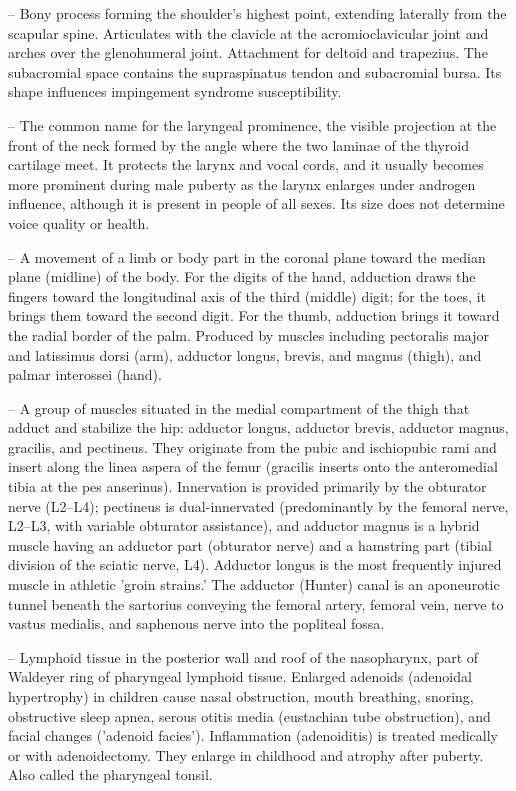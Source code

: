 -- Bony process forming the shoulder's highest point, extending laterally from the scapular spine. Articulates with the clavicle at the acromioclavicular joint and arches over the glenohumeral joint. Attachment for deltoid and trapezius. The subacromial space contains the supraspinatus tendon and subacromial bursa. Its shape influences impingement syndrome susceptibility.

-- The common name for the laryngeal prominence, the visible projection at the front of the neck formed by the angle where the two laminae of the thyroid cartilage meet. It protects the larynx and vocal cords, and it usually becomes more prominent during male puberty as the larynx enlarges under androgen influence, although it is present in people of all sexes. Its size does not determine voice quality or health.

-- A movement of a limb or body part in the coronal plane toward the median plane (midline) of the body. For the digits of the hand, adduction draws the fingers toward the longitudinal axis of the third (middle) digit; for the toes, it brings them toward the second digit. For the thumb, adduction brings it toward the radial border of the palm. Produced by muscles including pectoralis major and latissimus dorsi (arm), adductor longus, brevis, and magnus (thigh), and palmar interossei (hand).

-- A group of muscles situated in the medial compartment of the thigh that adduct and stabilize the hip: adductor longus, adductor brevis, adductor magnus, gracilis, and pectineus. They originate from the pubic and ischiopubic rami and insert along the linea aspera of the femur (gracilis inserts onto the anteromedial tibia at the pes anserinus). Innervation is provided primarily by the obturator nerve (L2--L4); pectineus is dual-innervated (predominantly by the femoral nerve, L2--L3, with variable obturator assistance), and adductor magnus is a hybrid muscle having an adductor part (obturator nerve) and a hamstring part (tibial division of the sciatic nerve, L4). Adductor longus is the most frequently injured muscle in athletic 'groin strains.' The adductor (Hunter) canal is an aponeurotic tunnel beneath the sartorius conveying the femoral artery, femoral vein, nerve to vastus medialis, and saphenous nerve into the popliteal fossa.

-- Lymphoid tissue in the posterior wall and roof of the nasopharynx, part of Waldeyer ring of pharyngeal lymphoid tissue. Enlarged adenoids (adenoidal hypertrophy) in children cause nasal obstruction, mouth breathing, snoring, obstructive sleep apnea, serous otitis media (eustachian tube obstruction), and facial changes ('adenoid facies'). Inflammation (adenoiditis) is treated medically or with adenoidectomy. They enlarge in childhood and atrophy after puberty. Also called the pharyngeal tonsil.

